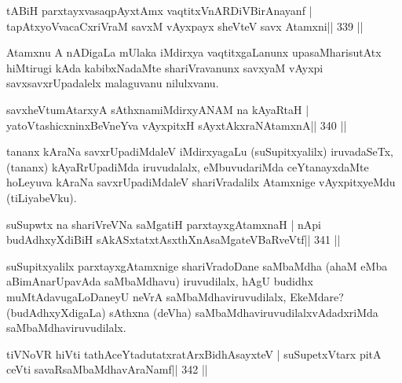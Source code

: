 \begin{shl}
tABiH parxtayxvasaqpAyx\s\s tAmx vaqtitxVnARDiVBirAnayanf |
\footnotemark[1]tapAtxyoVvacaCxriVraM savxM vAyxpayx sheVteV savx Atamxni\hfill || 339 ||
\end{shl}

\begin{artha}
Atamxnu A nADigaLa mUlaka iMdirxya vaqtitxgaLanunx upasaMharisutAtx  hiMtirugi kAda kabibxNadaMte shariVravanunx savxyaM vAyxpi savxsavxrUpadalelx malaguvanu nilulxvanu.
\end{artha}


\begin{shl}
savxheVtumAtarxyA sAthxnamiMdirxyANAM na kAyaRtaH |
yatoV\s tashicxninxBeVneYva vAyxpitxH sAyxtAkxraNAtamxnA\hfill || 340 ||
\end{shl}

\begin{artha}
tananx kAraNa savxrUpadiMdaleV iMdirxyagaLu (suSupitxyalilx)  iruvadaSeTx, (tananx) kAyaRrUpadiMda iruvudalalx, eMbuvudariMda ceYtanayxdaMte hoLeyuva kAraNa savxrUpadiMdaleV shariVradalilx Atamxnige vAyxpitxyeMdu (tiLiyabeVku).
\end{artha}


\begin{shl}
suSupwtx na shariVreVNa saMgatiH parxtayxgAtamxnaH |
nApi budAdhxyXdiBiH sAkASxtatxtAsxthXnAsaMgateVBaRveVtf\hfill || 341 ||
\end{shl}

\begin{artha}
suSupitxyalilx parxtayxgAtamxnige shariVradoDane saMbaMdha (ahaM eMba  aBimAnarUpavAda saMbaMdhavu) iruvudilalx, hAgU budidhx  muMtAdavugaLoDaneyU neVrA saMbaMdhaviruvudilalx, EkeMdare? (budAdhxyXdigaLa) sAthxna (deVha) saMbaMdhaviruvudilalxvAdadxriMda saMbaMdhaviruvudilalx.
\end{artha}


\begin{shl}
tiVNoVR hiVti tathAceYtadutatxratArxBidhAsayxteV |
suSupetxV\s tarx pitA ceVti savaRsaMbaMdhavAraNamf\hfill || 342 ||
\end{shl}

